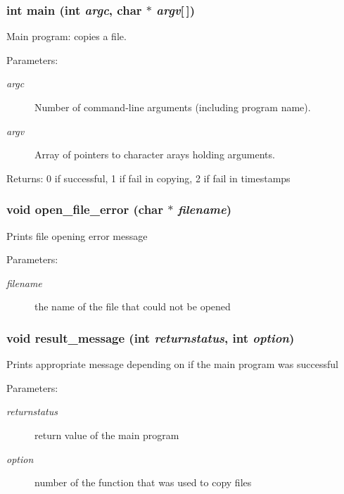\subsubsection{\setlength{\rightskip}{0pt plus 5cm}int main (int {\em argc}, char $\ast$ {\em argv}[$\,$])}\label{cptest_8c_28052c36c3b61c6c0eaa18f5d226118f}


Main program: copies a file. \begin{Desc}
\item[Parameters:]
\begin{description}
\item[{\em argc}]Number of command-line arguments (including program name). \item[{\em argv}]Array of pointers to character arays holding arguments. \end{description}
\end{Desc}
\begin{Desc}
\item[Returns:]0 if successful, 1 if fail in copying, 2 if fail in timestamps \end{Desc}
\subsubsection{\setlength{\rightskip}{0pt plus 5cm}void open\_\-file\_\-error (char $\ast$ {\em filename})}\label{cptest_8c_24e89f857b6c4f8cfadd8bf854978b28}


Prints file opening error message \begin{Desc}
\item[Parameters:]
\begin{description}
\item[{\em filename}]the name of the file that could not be opened \end{description}
\end{Desc}
\subsubsection{\setlength{\rightskip}{0pt plus 5cm}void result\_\-message (int {\em returnstatus}, int {\em option})}\label{cptest_8c_772406db6caedde5006575a15b4b3e7b}


Prints appropriate message depending on if the main program was successful \begin{Desc}
\item[Parameters:]
\begin{description}
\item[{\em returnstatus}]return value of the main program \item[{\em option}]number of the function that was used to copy files \end{description}
\end{Desc}
